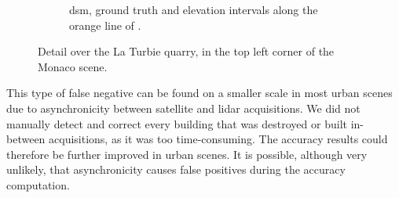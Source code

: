 \begin{figure}
\begin{subfigure}[t]{\linewidth}
        \caption{\acrshort{dsm}, ground truth and elevation intervals along the orange line of .}
        \label{fig:Carriere_row}
    \end{subfigure}
    \caption{Detail over the La Turbie quarry, in the top left corner of the Monaco scene.}
    \label{fig:Carriere}
\end{figure}

This type of false negative can be found on a smaller scale in most urban scenes due to asynchronicity between satellite and \acrshort{lidar} acquisitions. We did not manually detect and correct every building that was destroyed or built in-between acquisitions, as it was too time-consuming. The accuracy results could therefore be further improved in urban scenes. It is possible, although very unlikely, that asynchronicity causes false positives during the accuracy computation.

